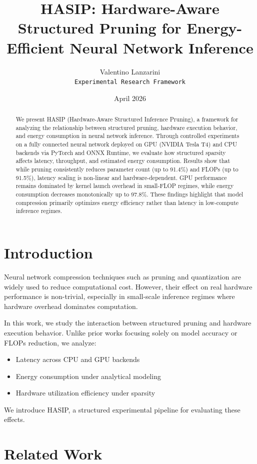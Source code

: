 \documentclass{article}
\title{
HASIP: Hardware-Aware Structured Pruning for Energy-Efficient Neural Network Inference
}
\author{
Valentino Lanzarini \\
\texttt{Experimental Research Framework}
}
\date{April 2026}
\begin{document}
\maketitle

\begin{abstract}
We present HASIP (Hardware-Aware Structured Inference Pruning), a framework for analyzing the relationship between structured pruning, hardware execution behavior, and energy consumption in neural network inference. Through controlled experiments on a fully connected neural network deployed on GPU (NVIDIA Tesla T4) and CPU backends via PyTorch and ONNX Runtime, we evaluate how structured sparsity affects latency, throughput, and estimated energy consumption. Results show that while pruning consistently reduces parameter count (up to 91.4\%) and FLOPs (up to 91.5\%), latency scaling is non-linear and hardware-dependent. GPU performance remains dominated by kernel launch overhead in small-FLOP regimes, while energy consumption decreases monotonically up to 97.8\%. These findings highlight that model compression primarily optimizes energy efficiency rather than latency in low-compute inference regimes.
\end{abstract}

\section{Introduction}

Neural network compression techniques such as pruning and quantization are widely used to reduce computational cost. However, their effect on real hardware performance is non-trivial, especially in small-scale inference regimes where hardware overhead dominates computation.

In this work, we study the interaction between structured pruning and hardware execution behavior. Unlike prior works focusing solely on model accuracy or FLOPs reduction, we analyze:

\begin{itemize}
    \item Latency across CPU and GPU backends
    \item Energy consumption under analytical modeling
    \item Hardware utilization efficiency under sparsity
\end{itemize}

We introduce HASIP, a structured experimental pipeline for evaluating these effects.

\section{Related Work}
\end{document}
